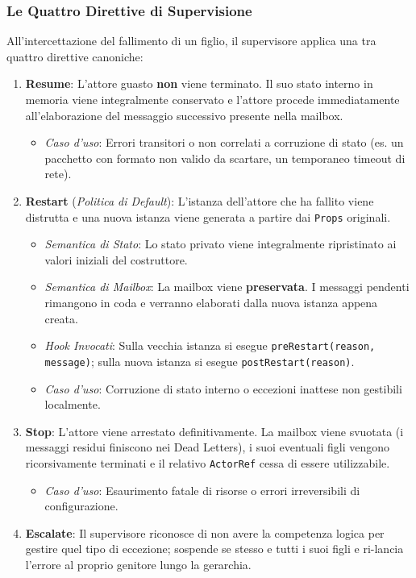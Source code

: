 \subsubsection{Le Quattro Direttive di Supervisione}
All'intercettazione del fallimento di un figlio, il supervisore applica una tra quattro direttive canoniche:
\begin{enumerate}
    \item \textbf{Resume}: L'attore guasto \textbf{non} viene terminato. Il suo stato interno in memoria viene integralmente conservato e l'attore procede immediatamente all'elaborazione del messaggio successivo presente nella mailbox.
    \begin{itemize}
        \item \textit{Caso d'uso}: Errori transitori o non correlati a corruzione di stato (es. un pacchetto con formato non valido da scartare, un temporaneo timeout di rete).
    \end{itemize}
    \item \textbf{Restart} (\textit{Politica di Default}): L'istanza dell'attore che ha fallito viene distrutta e una nuova istanza viene generata a partire dai \texttt{Props} originali.
    \begin{itemize}
        \item \textit{Semantica di Stato}: Lo stato privato viene integralmente ripristinato ai valori iniziali del costruttore.
        \item \textit{Semantica di Mailbox}: La mailbox viene \textbf{preservata}. I messaggi pendenti rimangono in coda e verranno elaborati dalla nuova istanza appena creata.
        \item \textit{Hook Invocati}: Sulla vecchia istanza si esegue \texttt{preRestart(reason, message)}; sulla nuova istanza si esegue \texttt{postRestart(reason)}.
        \item \textit{Caso d'uso}: Corruzione di stato interno o eccezioni inattese non gestibili localmente.
    \end{itemize}
    \item \textbf{Stop}: L'attore viene arrestato definitivamente. La mailbox viene svuotata (i messaggi residui finiscono nei Dead Letters), i suoi eventuali figli vengono ricorsivamente terminati e il relativo \texttt{ActorRef} cessa di essere utilizzabile.
    \begin{itemize}
        \item \textit{Caso d'uso}: Esaurimento fatale di risorse o errori irreversibili di configurazione.
    \end{itemize}
    \item \textbf{Escalate}: Il supervisore riconosce di non avere la competenza logica per gestire quel tipo di eccezione; sospende se stesso e tutti i suoi figli e ri-lancia l'errore al proprio genitore lungo la gerarchia.
\end{enumerate}

